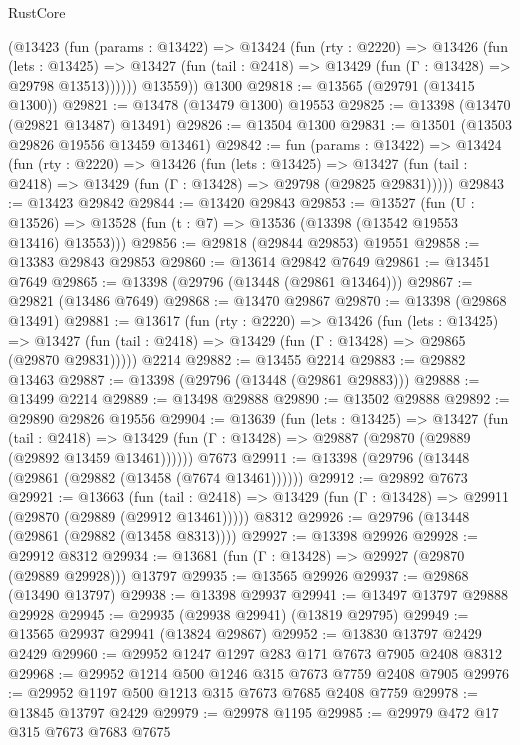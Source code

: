 \begin{lexlean}{RustCore}
\begin{coremodule}
        (@13423
          (fun (params : @13422) =>
          @13424
            (fun (rty : @2220) =>
            @13426
              (fun (lets : @13425) =>
              @13427 (fun (tail : @2418) => @13429 (fun (Γ : @13428) => @29798 @13513))))))
        @13559))
    @1300
@29818 := @13565 (@29791 (@13415 @1300))
@29821 := @13478 (@13479 @1300) @19553
@29825 := @13398 (@13470 (@29821 @13487) @13491)
@29826 := @13504 @1300
@29831 := @13501 (@13503 @29826 @19556 @13459 @13461)
@29842 := fun (params : @13422) =>
  @13424
    (fun (rty : @2220) =>
    @13426
      (fun (lets : @13425) =>
      @13427 (fun (tail : @2418) => @13429 (fun (Γ : @13428) => @29798 (@29825 @29831)))))
@29843 := @13423 @29842
@29844 := @13420 @29843
@29853 := @13527
    (fun (U : @13526) => @13528 (fun (t : @7) => @13536 (@13398 (@13542 @19553 @13416) @13553)))
@29856 := @29818 (@29844 @29853) @19551
@29858 := @13383 @29843 @29853
@29860 := @13614 @29842 @7649
@29861 := @13451 @7649
@29865 := @13398 (@29796 (@13448 (@29861 @13464)))
@29867 := @29821 (@13486 @7649)
@29868 := @13470 @29867
@29870 := @13398 (@29868 @13491)
@29881 := @13617
    (fun (rty : @2220) =>
    @13426
      (fun (lets : @13425) =>
      @13427 (fun (tail : @2418) => @13429 (fun (Γ : @13428) => @29865 (@29870 @29831)))))
    @2214
@29882 := @13455 @2214
@29883 := @29882 @13463
@29887 := @13398 (@29796 (@13448 (@29861 @29883)))
@29888 := @13499 @2214
@29889 := @13498 @29888
@29890 := @13502 @29888
@29892 := @29890 @29826 @19556
@29904 := @13639
    (fun (lets : @13425) =>
    @13427
      (fun (tail : @2418) =>
      @13429 (fun (Γ : @13428) => @29887 (@29870 (@29889 (@29892 @13459 @13461))))))
    @7673
@29911 := @13398 (@29796 (@13448 (@29861 (@29882 (@13458 (@7674 @13461))))))
@29912 := @29892 @7673
@29921 := @13663
    (fun (tail : @2418) => @13429 (fun (Γ : @13428) => @29911 (@29870 (@29889 (@29912 @13461)))))
    @8312
@29926 := @29796 (@13448 (@29861 (@29882 (@13458 @8313))))
@29927 := @13398 @29926
@29928 := @29912 @8312
@29934 := @13681 (fun (Γ : @13428) => @29927 (@29870 (@29889 @29928))) @13797
@29935 := @13565 @29926
@29937 := @29868 (@13490 @13797)
@29938 := @13398 @29937
@29941 := @13497 @13797 @29888 @29928
@29945 := @29935 (@29938 @29941) (@13819 @29795)
@29949 := @13565 @29937 @29941 (@13824 @29867)
@29952 := @13830 @13797 @2429 @2429
@29960 := @29952 @1247 @1297 @283 @171 @7673 @7905 @2408 @8312
@29968 := @29952 @1214 @500 @1246 @315 @7673 @7759 @2408 @7905
@29976 := @29952 @1197 @500 @1213 @315 @7673 @7685 @2408 @7759
@29978 := @13845 @13797 @2429
@29979 := @29978 @1195
@29985 := @29979 @472 @17 @315 @7673 @7683 @7675

\end{coremodule}
\end{lexlean}

